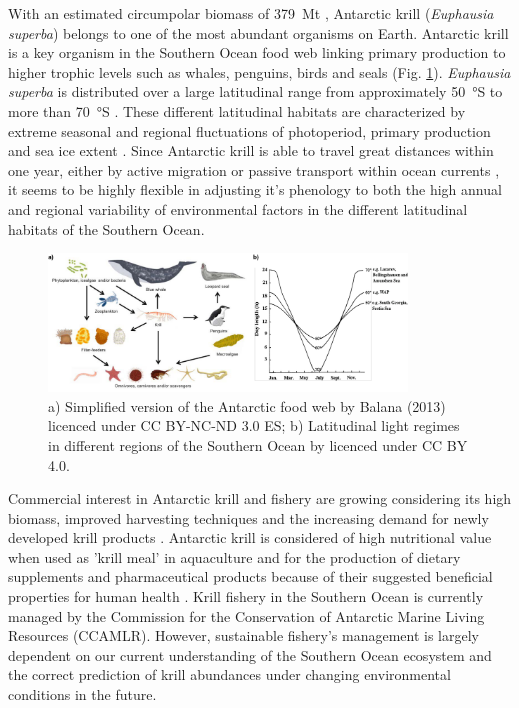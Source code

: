 With an estimated circumpolar biomass of \SI{379}{\mega\tonne} \citep{atkinson_life_1998},
Antarctic krill (\textit{Euphausia superba}) belongs to one of the
most abundant organisms on Earth. Antarctic krill is a key organism in the
Southern Ocean food web linking primary production to higher trophic levels
such as whales, penguins, birds and seals (Fig. \ref{figure1}). \textit{Euphausia superba}
is distributed over a large latitudinal range from approximately \SI{50}{\degree}S
to more than \SI{70}{\degree}S \citep{hill_potential_2013}. These different latitudinal
habitats are characterized by extreme seasonal and regional fluctuations of
photoperiod, primary production and sea ice extent \citep{quetin_behavioral_1991}.
Since Antarctic krill is able to travel great distances within one year, either
by active migration \citep{siegel_concept_1988} or passive transport within ocean currents \citep{thorpe_circumpolar_2007}, it seems to be highly flexible in adjusting it's
phenology to both the high annual and regional variability of environmental
factors in the different latitudinal habitats of the Southern Ocean.

\begin{figure}
        \centering
        \includegraphics[width=0.85\textwidth]{../Figures/Figure1.pdf}
        \caption{a) Simplified version of the Antarctic food web by Balana
        (2013) licenced under CC BY-NC-ND 3.0 ES; b) Latitudinal light regimes
        in different regions of the Southern Ocean by \citet{meyer_performance_2012} licenced
        under CC BY 4.0.}
        \label{figure1}
\end{figure}

Commercial interest in Antarctic krill and fishery are growing considering its
high biomass, improved harvesting techniques and the increasing demand for
newly developed krill products \citep{nicol_fishery_2012}. Antarctic krill is
considered of high nutritional value when used as 'krill meal' in aquaculture \citep{yoshitomi_effect_2007} and for the production of dietary supplements and
pharmaceutical products because of their suggested beneficial properties for
human health \citep{tou_krill_2008}. Krill fishery in the Southern Ocean is
currently managed by the Commission for the Conservation of Antarctic Marine
Living Resources (CCAMLR). However, sustainable fishery's management is largely
dependent on our current understanding of the Southern Ocean ecosystem and the
correct prediction of krill abundances under changing environmental conditions
in the future.

